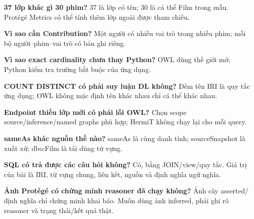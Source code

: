 \documentclass[
  11pt,
]{article}
\begin{document}
\textbf{37 lớp khác gì 30 phim?} 37 là lớp có tên; 30 là cá thể Film
trong mẫu. Protégé Metrics có thể tính thêm lớp ngoài được tham chiếu.

\textbf{Vì sao cần Contribution?} Một người có nhiều vai trò trong nhiều
phim; mỗi bộ người--phim--vai trò có bản ghi riêng.

\textbf{Vì sao exact cardinality chưa thay Python?} OWL dùng thế giới
mở; Python kiểm tra trường bắt buộc của ứng dụng.

\textbf{COUNT DISTINCT có phải suy luận DL không?} Đếm tên IRI là quy
tắc ứng dụng; OWL không mặc định tên khác nhau chỉ cá thể khác nhau.

\textbf{Endpoint thiếu lớp mới có phải lỗi OWL?} Chọn scope
source/\allowbreak{}i\allowbreak{}nference\allowbreak{}/\allowbreak{}named
graphs phù hợp; HermiT không chạy lại cho mỗi query.

\textbf{sameAs khác nguồn thế nào?} sameAs là cùng danh tính;
source\allowbreak{}Sn\allowbreak{}apshot là xuất xứ; dbo:Film là tái
dùng từ vựng.

\textbf{SQL có trả được các câu hỏi không?} Có, bằng
J\allowbreak{}O\allowbreak{}I\allowbreak{}N/\allowbreak{}vie\allowbreak{}w/\allowbreak{}quy
tắc. Giá trị của bài là IRI, từ vựng chung, liên kết, nguồn và định
nghĩa ngữ nghĩa.

\textbf{Ảnh Protégé có chứng minh reasoner đã chạy không?} Ảnh cây
asserted/định nghĩa chỉ chứng minh khai báo. Muốn dùng ảnh inferred,
phải ghi rõ reasoner và trạng thái/kết quả thật.
\end{document}
